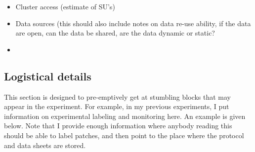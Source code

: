 \documentclass[a4paper,11pt]{article}
\begin{document}
 \begin{itemize}
  \item Cluster access (estimate of SU's)
  \item Data sources (this should also include notes on data re-use ability, if the data are open, can the data be shared, are the data dynamic or static?
  \item 
 \end{itemize}






\subsection*{Logistical details}

This section is designed to pre-emptively get at stumbling blocks that may appear in the experiment. For example, in my previous experiments, I put information on experimental labeling and monitoring here. An example is given below. Note that I provide enough information where anybody reading this should be able to label patches, and then point to the place where the protocol and data sheets are stored. 




\noindent{}
\end{document}
